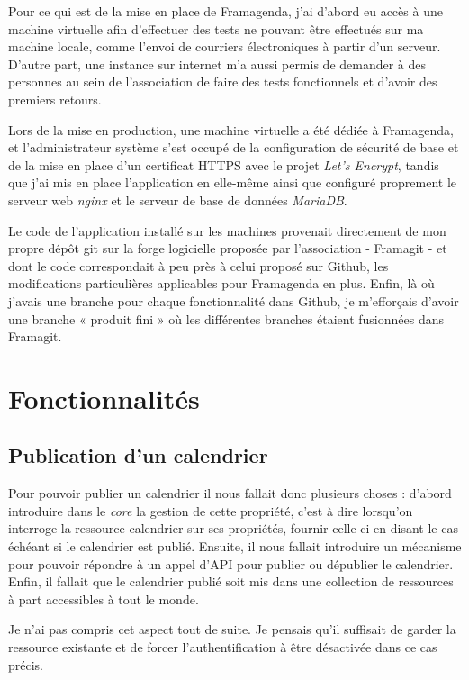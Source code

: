 \documentclass[10pt,a4paper, twoside]{report}
\begin{document}
	Pour ce qui est de la mise en place de Framagenda, j'ai d'abord eu accès à une machine virtuelle afin d'effectuer des tests ne pouvant être effectués sur ma machine locale, comme l'envoi de courriers électroniques à partir d'un serveur. D'autre part, une instance sur internet m'a aussi permis de demander à des personnes au sein de l'association de faire des tests fonctionnels et d'avoir des premiers retours.
	
	Lors de la mise en production, une machine virtuelle a été dédiée à Framagenda, et l'administrateur système s'est occupé de la configuration de sécurité de base et de la mise en place d'un certificat \textsc{HTTPS} avec le projet \textit{Let's Encrypt}, tandis que j'ai mis en place l'application en elle-même ainsi que configuré proprement le serveur web \textit{nginx} et le serveur de base de données \textit{MariaDB}.
	
	Le code de l'application installé sur les machines provenait directement de mon propre dépôt git sur la forge logicielle proposée par l'association - Framagit - et dont le code correspondait à peu près à celui proposé sur Github, les modifications particulières applicables pour Framagenda en plus. Enfin, là où j'avais une branche pour chaque fonctionnalité dans Github, je m'efforçais d'avoir une branche « produit fini » où les différentes branches étaient fusionnées dans Framagit.
	
	\section{Fonctionnalités}
	\subsection{Publication d'un calendrier}
	Pour pouvoir publier un calendrier il nous fallait donc plusieurs choses : d'abord introduire dans le \textit{core} la gestion de cette propriété, c'est à dire lorsqu'on interroge la ressource calendrier sur ses propriétés, fournir celle-ci en disant le cas échéant si le calendrier est publié.
	Ensuite, il nous fallait introduire un mécanisme pour pouvoir répondre à un appel d'API pour publier ou dépublier le calendrier. Enfin, il fallait que le calendrier publié soit mis dans une collection de ressources à part accessibles à tout le monde.
	
	Je n'ai pas compris cet aspect tout de suite. Je pensais qu'il suffisait de garder la ressource existante et de forcer l'authentification à être désactivée dans ce cas précis.
	
\end{document}
